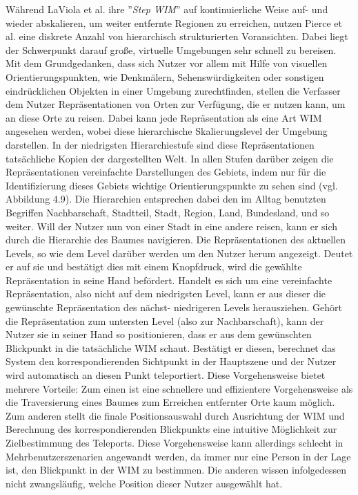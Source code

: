 Während LaViola et al. ihre ”\textit{Step WIM}” auf kontinuierliche Weise auf- und wieder abskalieren, um weiter entfernte Regionen zu erreichen, nutzen Pierce et al. \cite{pierce_representations} eine diskrete Anzahl von hierarchisch strukturierten Voransichten. Dabei liegt der Schwerpunkt darauf große, virtuelle Umgebungen sehr schnell zu bereisen.
Mit dem Grundgedanken, dass sich Nutzer vor allem mit Hilfe von visuellen Orientierungspunkten, wie Denkmälern, Sehenswürdigkeiten oder sonstigen eindrücklichen Objekten in einer Umgebung zurechtfinden, stellen die Verfasser dem Nutzer Repräsentationen von Orten zur Verfügung, die er nutzen kann, um an diese Orte zu reisen.
Dabei kann jede Repräsentation als eine Art WIM angesehen werden, wobei diese hierarchische Skalierungslevel der Umgebung darstellen. In der niedrigsten Hierarchiestufe sind diese Repräsentationen tatsächliche Kopien der dargestellten Welt. In allen Stufen darüber zeigen die Repräsentationen vereinfachte Darstellungen des Gebiets, indem nur für die Identifizierung dieses Gebiets wichtige Orientierungspunkte zu sehen sind (vgl. Abbildung 4.9).
Die Hierarchien entsprechen dabei den im Alltag benutzten Begriffen \glqq Nachbarschaft\grqq{}, \glqq Stadtteil\grqq{}, \glqq Stadt\grqq{}, \glqq Region\grqq{}, \glqq Land\grqq{}, \glqq Bundesland\grqq{}, und so weiter.
Will der Nutzer nun von einer Stadt in eine andere reisen, kann er sich durch die Hierarchie des Baumes navigieren. Die Repräsentationen des aktuellen Levels, so wie dem Level darüber werden um den Nutzer herum angezeigt. Deutet er auf sie und bestätigt dies mit einem Knopfdruck, wird die gewählte Repräsentation in seine Hand befördert. Handelt es sich um eine vereinfachte Repräsentation, also nicht auf dem niedrigsten Level, kann er aus dieser die gewünschte Repräsentation des nächst- niedrigeren Levels herausziehen. 
Gehört die Repräsentation zum untersten Level (also zur \glqq Nachbarschaft\grqq{}), kann der Nutzer sie in seiner Hand so positionieren, dass er aus dem gewünschten Blickpunkt in die tatsächliche WIM schaut. Bestätigt er diesen, berechnet das System den korrespondierenden Sichtpunkt in der Hauptszene und der Nutzer wird automatisch an diesen Punkt teleportiert.
Diese Vorgehensweise bietet mehrere Vorteile: Zum einen ist eine schnellere und effizientere Vorgehensweise als die Traversierung eines Baumes zum Erreichen entfernter Orte kaum möglich. Zum anderen stellt die finale Positionsauswahl durch Ausrichtung der WIM und Berechnung des korrespondierenden Blickpunkts eine intuitive Möglichkeit zur Zielbestimmung des Teleports. Diese Vorgehensweise kann allerdings schlecht in Mehrbenutzerszenarien angewandt werden, da immer nur eine Person in der Lage ist, den Blickpunkt in der WIM zu bestimmen. Die anderen wissen infolgedessen nicht zwangsläufig, welche Position dieser Nutzer ausgewählt hat.

